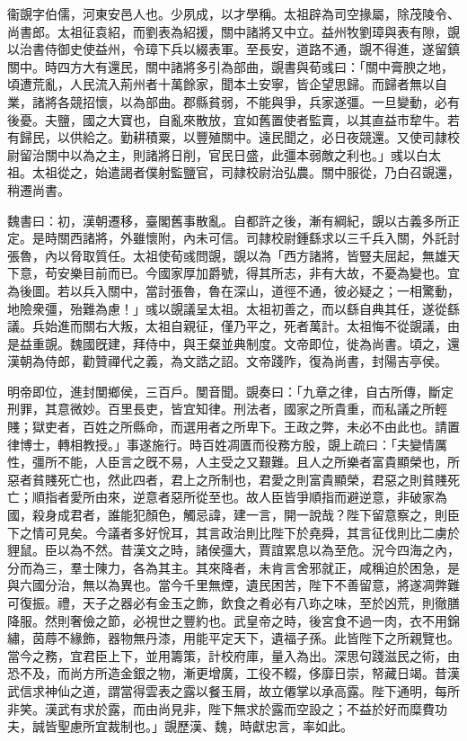
\begin{pinyinscope}
衞覬字伯儒，河東安邑人也。少夙成，以才學稱。太祖辟為司空掾屬，除茂陵令、尚書郎。太祖征袁紹，而劉表為紹援，關中諸將又中立。益州牧劉璋與表有隙，覬以治書侍御史使益州，令璋下兵以綴表軍。至長安，道路不通，覬不得進，遂留鎮關中。時四方大有還民，關中諸將多引為部曲，覬書與荀彧曰：「關中膏腴之地，頃遭荒亂，人民流入荊州者十萬餘家，聞本土安寧，皆企望思歸。而歸者無以自業，諸將各競招懷，以為部曲。郡縣貧弱，不能與爭，兵家遂彊。一旦變動，必有後憂。夫鹽，國之大寶也，自亂來散放，宜如舊置使者監賣，以其直益巿犂牛。若有歸民，以供給之。勤耕積粟，以豐殖關中。遠民聞之，必日夜競還。又使司隷校尉留治關中以為之主，則諸將日削，官民日盛，此彊本弱敵之利也。」彧以白太祖。太祖從之，始遣謁者僕射監鹽官，司隷校尉治弘農。關中服從，乃白召覬還，稍遷尚書。

魏書曰：初，漢朝遷移，臺閣舊事散亂。自都許之後，漸有綱紀，覬以古義多所正定。是時關西諸將，外雖懷附，內未可信。司隷校尉鍾繇求以三千兵入關，外託討張魯，內以脅取質任。太祖使荀彧問覬，覬以為「西方諸將，皆豎夫屈起，無雄天下意，苟安樂目前而已。今國家厚加爵號，得其所志，非有大故，不憂為變也。宜為後圖。若以兵入關中，當討張魯，魯在深山，道徑不通，彼必疑之；一相驚動，地險衆彊，殆難為慮！」彧以覬議呈太祖。太祖初善之，而以繇自典其任，遂從繇議。兵始進而關右大叛，太祖自親征，僅乃平之，死者萬計。太祖悔不從覬議，由是益重覬。魏國旣建，拜侍中，與王粲並典制度。文帝即位，徙為尚書。頃之，還漢朝為侍郎，勸贊禪代之義，為文誥之詔。文帝踐阼，復為尚書，封陽吉亭侯。

明帝即位，進封閺鄉侯，三百戶。閺音聞。覬奏曰：「九章之律，自古所傳，斷定刑罪，其意微妙。百里長吏，皆宜知律。刑法者，國家之所貴重，而私議之所輕賤；獄吏者，百姓之所縣命，而選用者之所卑下。王政之弊，未必不由此也。請置律博士，轉相教授。」事遂施行。時百姓凋匱而役務方殷，覬上疏曰：「夫變情厲性，彊所不能，人臣言之旣不易，人主受之又艱難。且人之所樂者富貴顯榮也，所惡者貧賤死亡也，然此四者，君上之所制也，君愛之則富貴顯榮，君惡之則貧賤死亡；順指者愛所由來，逆意者惡所從至也。故人臣皆爭順指而避逆意，非破家為國，殺身成君者，誰能犯顏色，觸忌諱，建一言，開一說哉？陛下留意察之，則臣下之情可見矣。今議者多好恱耳，其言政治則比陛下於堯舜，其言征伐則比二虜於貍鼠。臣以為不然。昔漢文之時，諸侯彊大，賈誼累息以為至危。況今四海之內，分而為三，羣士陳力，各為其主。其來降者，未肯言舍邪就正，咸稱迫於困急，是與六國分治，無以為異也。當今千里無煙，遺民困苦，陛下不善留意，將遂凋弊難可復振。禮，天子之器必有金玉之飾，飲食之肴必有八珎之味，至於凶荒，則徹膳降服。然則奢儉之節，必視世之豐約也。武皇帝之時，後宮食不過一肉，衣不用錦繡，茵蓐不緣飾，器物無丹漆，用能平定天下，遺福子孫。此皆陛下之所親覽也。當今之務，宜君臣上下，並用籌策，計校府庫，量入為出。深思句踐滋民之術，由恐不及，而尚方所造金銀之物，漸更增廣，工役不輟，侈靡日崇，帑藏日竭。昔漢武信求神仙之道，謂當得雲表之露以餐玉屑，故立僊掌以承高露。陛下通明，每所非笑。漢武有求於露，而由尚見非，陛下無求於露而空設之；不益於好而糜費功夫，誠皆聖慮所宜裁制也。」覬歷漢、魏，時獻忠言，率如此。


\end{pinyinscope}
